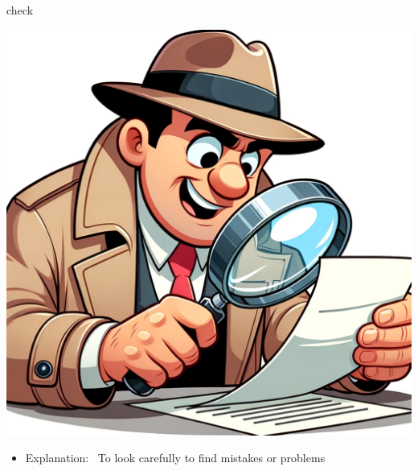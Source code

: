 \documentclass[avery5371, grid,frame]{flashcards}
\begin{document}
\renewcommand{\cardpaper}{a4paper}
\renewcommand{\cardpapermode}{landscape}
\renewcommand{\cardrows}{2}
\renewcommand{\cardcolumns}{2}
\setlength{\cardheight}{3.5in}
\setlength{\cardwidth}{5.0in}
\setlength{\topoffset}{0.65in}
\setlength{\oddoffset}{0.65in}
\setlength{\evenoffset}{0.65in}

\begin{flashcard}{check}
    \vspace*{\fill}
    \begin{center}
        \begin{minipage}[c]{.45\textwidth}
            \includegraphics[width=\textwidth]{cards/c/check/check - a detective with a magnifying glass closely examining a document, searching for clues.png}
        \end{minipage}
        \begin{minipage}[c]{.45\textwidth}
            \begin{itemize}\setlength\itemsep{12pt}
            \item Explanation: \ To look carefully to find mistakes or problems


\end{itemize}
\end{minipage}
\end{center}
\end{flashcard}
\end{document}
